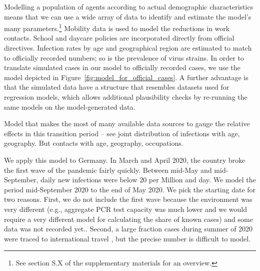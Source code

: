 Modelling a population of agents according to actual demographic characteristics means
that we can use a wide array of data to identify and estimate the model's many
parameters.\footnote{See section S.X of the supplementary materials for an
overview.} Mobility data is used to
model the reductions in work contacts. School and daycare policies are incorporated
directly from official directives. Infection rates by age and geographical region are
estimated to match to officially recorded numbers; so is the prevalence of virus
strains. In order to translate simulated cases in our model to officially recorded
cases, we use the model depicted in Figure~\ref{fig:model_for_official_cases}.
 A further advantage is that the simulated data have a
structure that resembles datasets used for regression models, which allows additional
plausibility checks by re-running the same models on the model-generated
data.

Model that makes the most of many available data sources to gauge the relative effects
in this transition period -- see joint distribution of infections with age, geography.
But contacts with age, geography, occupations.

We apply this model to Germany. In March and April 2020, the country broke the first
wave of the pandemic fairly quickly. Between mid-May and mid-September, daily new
infections were below 20 per Million and day. We
model the period mid-September 2020 to the end of May 2020. We pick the starting date
for two reasons. First, we do not include the first wave because the environment was
very different (e.g., aggregate PCR test capacity was much lower and we would require a
very different model for calculating the share of known cases) and some data was not
recorded yet.. Second, a large fraction cases during summer of 2020 were traced to international
travel \citep{KochInstitut2021}, but the precise number is difficult to model.

